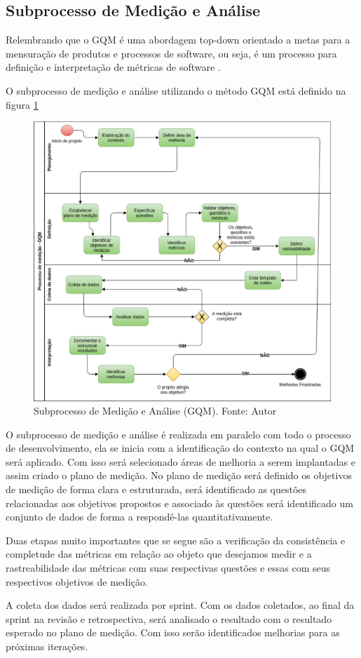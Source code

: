 \subsection{Subprocesso de Medição e Análise}

Relembrando que o GQM é uma abordagem top-down orientado a metas para a mensuração de produtos e processos de software,
ou seja, é um processo para definição e interpretação de métricas de software \cite{junior}.

O subprocesso de medição e análise utilizando o método GQM está definido na figura \ref{fig:gqm}

\begin{figure}[H]
	\centering
  \includegraphics[keepaspectratio=true,scale=0.5]{figuras/processo_gqm.eps}
  \caption[Subprocesso de Medição e Análise (GQM).]{Subprocesso de Medição e Análise (GQM). Fonte: Autor}
	\label{fig:gqm}
\end{figure}

O subprocesso de medição e análise é realizada em paralelo com todo o processo de desenvolvimento, ela se inicia com a identificação do contexto na qual o GQM será aplicado. Com isso será selecionado áreas de melhoria a serem implantadas e assim criado o plano de medição. No plano de medição será definido os objetivos de medição de forma clara e estruturada, será identificado as questões relacionadas aos objetivos propostos e associado às questões será identificado um conjunto de dados de forma a respondê-las quantitativamente.

Duas etapas muito importantes que se segue são a verificação da consistência e completude das métricas em relação ao objeto que desejamos medir e a rastreabilidade das métricas com suas respectivas questões e essas com seus respectivos objetivos de medição.

A coleta dos dados será realizada por sprint. Com os dados coletados, ao final da sprint na revisão e retrospectiva, será analisado o resultado com o resultado esperado no plano de medição. Com isso serão identificados melhorias para as próximas iterações.
